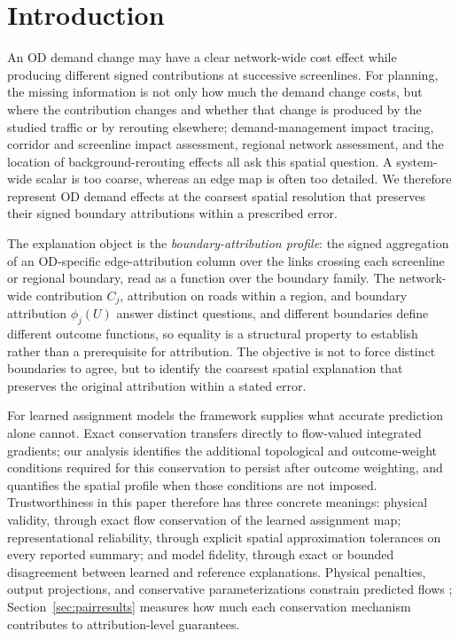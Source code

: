 \documentclass[a4paper,fleqn]{cas-sc}
\begin{document}
\section{Introduction}\label{sec:intro}
An OD demand change may have a clear network-wide cost effect while
producing different signed contributions at successive screenlines. For
planning, the missing information is not only how much the demand change
costs, but where the contribution changes and whether that change is
produced by the studied traffic or by rerouting elsewhere; demand-management
impact tracing, corridor and screenline impact assessment, regional network
assessment, and the location of background-rerouting effects all ask this
spatial question. A system-wide scalar is too coarse, whereas an edge map
is often too detailed. We therefore represent OD demand effects at the
coarsest spatial resolution that preserves their signed boundary
attributions within a prescribed error.

The explanation object is the \emph{boundary-attribution profile}: the
signed aggregation of an OD-specific edge-attribution column over the
links crossing each screenline or regional boundary, read as a function
over the boundary family. The network-wide contribution $C_j$,
attribution on roads within a region, and boundary attribution $\phi_j(U)$
answer distinct questions, and different boundaries define different
outcome functions, so equality is a structural property to establish
rather than a prerequisite for attribution. The objective is not to
force distinct boundaries to agree, but to identify the coarsest spatial
explanation that preserves the original attribution within a stated
error.

For learned assignment models the framework supplies what accurate
prediction alone cannot. Exact conservation transfers directly to
flow-valued integrated gradients; our analysis identifies the additional
topological and outcome-weight conditions required for this conservation
to persist after outcome weighting, and quantifies the spatial profile
when those conditions are not imposed. Trustworthiness in this paper
therefore has three concrete meanings: physical validity, through exact
flow conservation of the learned assignment map; representational
reliability, through explicit spatial approximation tolerances on every
reported summary; and model fidelity, through exact or bounded
disagreement between learned and reference explanations. Physical
penalties, output projections, and conservative parameterizations
constrain predicted flows
\citep{raissi2019physics,shi2021physics,valente2025physics,richterpowell2022neural};
Section~\ref{sec:pairresults} measures how much each conservation
mechanism contributes to attribution-level guarantees.
\end{document}
